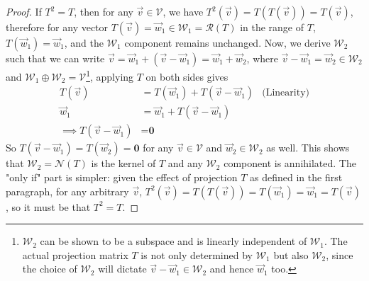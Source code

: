 \begin{proof}
If $T^2 = T$, then for any $\vec{v} \in \mathcal{V}$, we have $T^2(\vec{v}) = T(T(\vec{v})) = T(\vec{v})$, therefore for any vector $T(\vec{v}) = \vec{w}_1 \in \mathcal{W}_1 = \mathcal{R}(T)$ in the range of $T$, $T(\vec{w}_1) = \vec{w}_1$, and the $\mathcal{W}_1$ component remains unchanged. Now, we derive $\mathcal{W}_2$ such that we can write $\vec{v} = \vec{w}_1 + (\vec{v} - \vec{w}_1) = \vec{w}_1 + \vec{w}_2$, where $\vec{v} - \vec{w}_1 = \vec{w}_2 \in \mathcal{W}_2$ and $\mathcal{W}_1 \oplus \mathcal{W}_2 = \mathcal{V}$\footnote{$\mathcal{W}_2$ can be shown to be a subspace and is linearly independent of $\mathcal{W}_1$. The actual projection matrix $T$ is not only determined by $\mathcal{W}_1$ but also $\mathcal{W}_2$, since the choice of $\mathcal{W}_2$ will dictate $\vec{v} - \vec{w}_1 \in \mathcal{W}_2$ and hence $\vec{w}_1$ too.}, applying $T$ on both sides gives 
\begin{align*}
T(\vec{v}) &= T(\vec{w}_1) + T(\vec{v} - \vec{w}_1) & \text{(Linearity)}\\
\vec{w}_1 &= \vec{w}_1 + T(\vec{v} - \vec{w}_1) \\
\implies T(\vec{v} - \vec{w}_1) &= \textbf{0}
\end{align*}
So $T(\vec{v} - \vec{w}_1) = T(\vec{w}_2) = \textbf{0}$ for any $\vec{v} \in \mathcal{V}$ and $\vec{w}_2 \in \mathcal{W}_2$ as well. This shows that $\mathcal{W}_2 = \mathcal{N}(T)$ is the kernel of $T$ and any $\mathcal{W}_2$ component is annihilated. The "only if" part is simpler: given the effect of projection $T$ as defined in the first paragraph, for any arbitrary $\vec{v}$, $T^2(\vec{v}) = T(T(\vec{v})) = T(\vec{w}_1) = \vec{w}_1 = T(\vec{v})$, so it must be that $T^2 = T$.
\end{proof}

